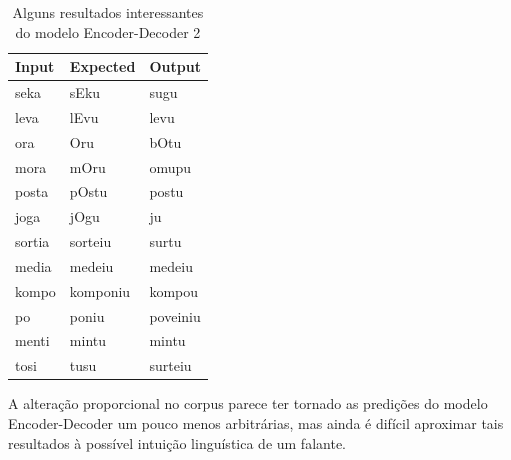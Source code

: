 \begin{table}[H]
\centering
\begin{tabular}{lll}
\textbf{Input} & \textbf{Expected} & \textbf{Output} \\ \hline
seka& sEku& sugu \\
leva& lEvu& levu \\
ora& Oru& bOtu\\
mora& mOru& omupu\\
posta& pOstu& postu\\
joga& jOgu& ju\\
sortia& sorteiu& surtu\\
media& medeiu& medeiu\\
kompo& komponiu& kompou\\
po& poniu& poveiniu\\
menti& mintu& mintu\\
tosi& tusu& surteiu\\
\end{tabular}
\caption{Alguns resultados interessantes do modelo Encoder-Decoder 2}
\label{tab:res2}
\end{table}

A alteração proporcional no corpus parece ter tornado as predições do modelo Encoder-Decoder um pouco menos arbitrárias, mas ainda é difícil aproximar tais resultados à possível intuição linguística de um falante.  

 



